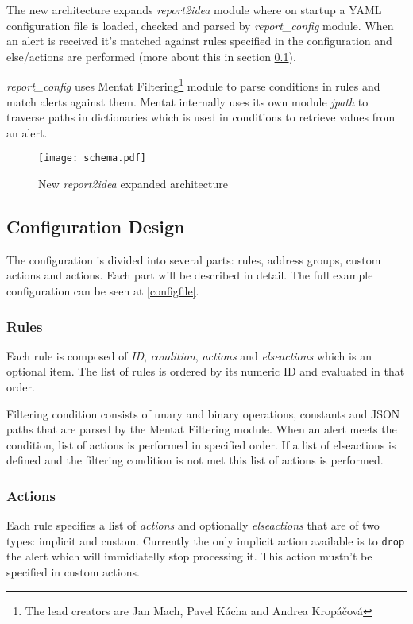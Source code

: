 \documentclass[11pt,a4paper]{article}
\begin{document}
The new architecture expands \textit{report2idea} module where on startup a YAML configuration file is loaded, checked and parsed by \textit{report\_config} module. When an alert is received it's matched against rules specified in the configuration and else/actions are performed (more about this in section \ref{confdesign}).

\textit{report\_config} uses Mentat Filtering\footnote{The lead creators are Jan Mach, Pavel Kácha and Andrea Kropáčová} module to parse conditions in rules and match alerts against them. Mentat internally uses its own module \textit{jpath} to traverse paths in dictionaries which is used in conditions to retrieve values from an alert.

\begin{figure}[ht]
    \texttt{[image: schema.pdf]}
    \centering
	\caption{New \textit{report2idea} expanded architecture}
    \label{schema}
\end{figure}

\subsection{Configuration Design}
\label{confdesign}
The configuration is divided into several parts: rules, address groups, custom actions and actions. Each part will be described in detail. The full example configuration can be seen at \ref{configfile}.

\subsubsection{Rules}
Each rule is composed of \textit{ID}, \textit{condition}, \textit{actions} and \textit{elseactions} which is an optional item. The list of rules is ordered by its numeric ID and evaluated in that order.

Filtering condition consists of unary and binary operations, constants and JSON paths that are parsed by the Mentat Filtering module. When an alert meets the condition, list of actions is performed in specified order. If a list of elseactions is defined and the filtering condition is not met this list of actions is performed.

\subsubsection{Actions}
Each rule specifies a list of \textit{actions} and optionally \textit{elseactions} that are of two types: implicit and custom. Currently the only implicit action available is to \texttt{drop} the alert which will immidiatelly stop processing it. This action mustn't be specified in custom actions.
\end{document}
